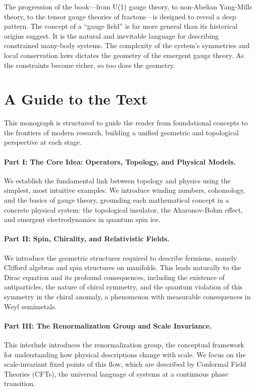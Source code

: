 The progression of the book---from U(1) gauge theory, to non-Abelian Yang-Mills theory, to the tensor gauge theories of fractons---is designed to reveal a deep pattern. The concept of a ``gauge field'' is far more general than its historical origins suggest. It is the natural and inevitable language for describing constrained many-body systems. The complexity of the system's symmetries and local conservation laws dictates the geometry of the emergent gauge theory. As the constraints become richer, so too does the geometry.

\section{A Guide to the Text}

This monograph is structured to guide the reader from foundational concepts to the frontiers of modern research, building a unified geometric and topological perspective at each stage.

\paragraph{Part I: The Core Idea: Operators, Topology, and Physical Models.} We establish the fundamental link between topology and physics using the simplest, most intuitive examples. We introduce winding numbers, cohomology, and the basics of gauge theory, grounding each mathematical concept in a concrete physical system: the topological insulator, the Aharonov-Bohm effect, and emergent electrodynamics in quantum spin ice.

\paragraph{Part II: Spin, Chirality, and Relativistic Fields.} We introduce the geometric structures required to describe fermions, namely Clifford algebras and spin structures on manifolds. This leads naturally to the Dirac equation and its profound consequences, including the existence of antiparticles, the nature of chiral symmetry, and the quantum violation of this symmetry in the chiral anomaly, a phenomenon with measurable consequences in Weyl semimetals.

\paragraph{Part III: The Renormalization Group and Scale Invariance.} This interlude introduces the renormalization group, the conceptual framework for understanding how physical descriptions change with scale. We focus on the scale-invariant fixed points of this flow, which are described by Conformal Field Theories (CFTs), the universal language of systems at a continuous phase transition.

